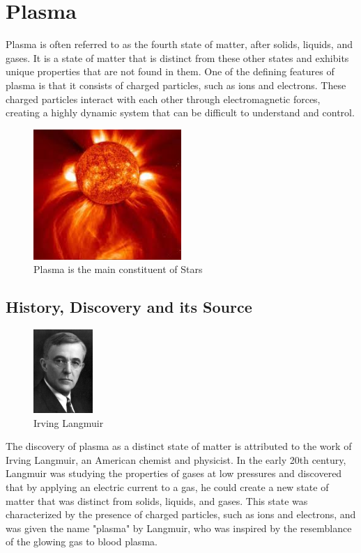 \documentclass{article}
\begin{document}
\section{Plasma}
\large
Plasma is often referred to as the fourth state of matter, after solids, liquids, and gases. It is a state of matter that is distinct from these other states and exhibits unique properties that are not found in them. One of the defining features of plasma is that it consists of charged particles, such as ions and electrons. These charged particles interact with each other through electromagnetic forces, creating a highly dynamic system that can be difficult to understand and control.
\begin{figure}
\centering
\includegraphics[width=0.5\textwidth]{Plasma.jpg}
\caption{\label{fig:Plasma } Plasma is the main constituent of Stars}
\end{figure}

\subsection{History, Discovery and its Source}
\begin{figure}
    \centering
    \includegraphics[width=0.2\textwidth]{Langmuir.jpg}
    \caption{\label{fig:Langmuir} Irving Langmuir} 
\end{figure}

The discovery of plasma as a distinct state of matter is attributed to the work of Irving Langmuir, an American chemist and physicist. In the early 20th century, Langmuir was studying the properties of gases at low pressures and discovered that by applying an electric current to a gas, he could create a new state of matter that was distinct from solids, liquids, and gases. This state was characterized by the presence of charged particles, such as ions and electrons, and was given the name "plasma" by Langmuir, who was inspired by the resemblance of the glowing gas to blood plasma.
\end{document}
